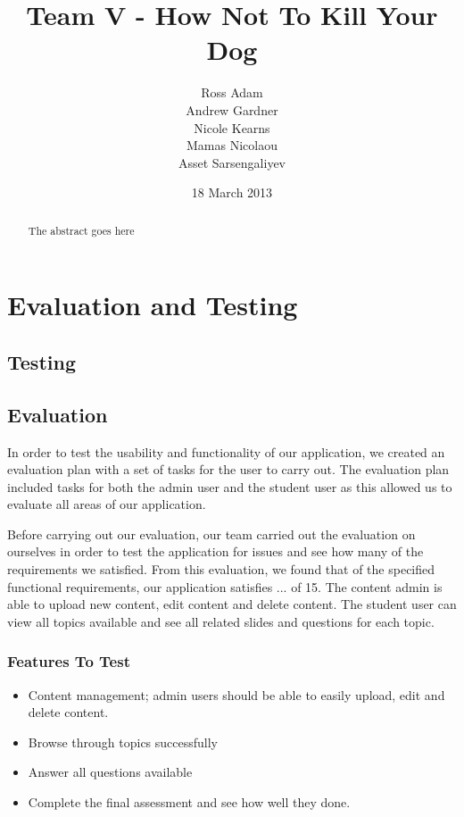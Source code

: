\documentclass{l3proj}
\begin{document}
\title{Team V - How Not To Kill Your Dog}
\author{Ross Adam \\
        Andrew Gardner \\
        Nicole Kearns \\
        Mamas Nicolaou \\
        Asset Sarsengaliyev}
\date{18 March 2013}
\maketitle
\begin{abstract}

The abstract goes here

\end{abstract}
\educationalconsent
\tableofcontents

\chapter{Evaluation and Testing}
\label{evaluation}

\section{Testing}

\section{Evaluation}

In order to test the usability and functionality of our application, we created an evaluation plan with a set of tasks for the user to carry out. The evaluation plan included tasks for both the admin user and the student user as this allowed us to evaluate all areas of our application.

Before carrying out our evaluation, our team carried out the evaluation on ourselves in order to test the application for issues and see how many of the requirements we satisfied. From this evaluation, we found that of the specified functional requirements, our application satisfies ... of 15. The content admin is able to upload new content, edit content and delete content. The student user can view all topics available and see all related slides and questions for each topic.

\subsection{Features To Test}

\begin{itemize}
\item Content management; admin users should be able to easily upload, edit and delete content.
\item Browse through topics successfully
\item Answer all questions available
\item Complete the final assessment and see how well they done.
\end{itemize}
\end{document}
